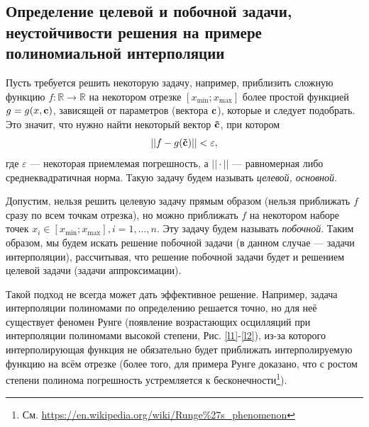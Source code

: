 \documentclass[a4paper]{article}
\begin{document}
\FloatBarrier 
\subsection{Определение целевой и побочной задачи, неустойчивости решения на примере полиномиальной интерполяции}
Пусть требуется решить некоторую задачу, например, приблизить сложную функцию $f: \mathbb{R} \rightarrow \mathbb{R}$
на некотором отрезке $[x_{\min};x_{\max}]$ более простой функцией $g=g(x,{\bf c})$, зависящей от параметров (вектора ${\bf c}$), которые и следует подобрать.
Это значит, что нужно найти некоторый вектор ${\bf \tilde{c} }$, при котором
\begin{equation*}
  ||f-g({\bf \tilde{c}})|| < \varepsilon,
\end{equation*}
где $\varepsilon$ --- некоторая приемлемая погрешность, а $||\cdot||$ --- равномерная либо среднеквадратичная норма.
Такую задачу будем называть {\it целевой, основной}.

Допустим, нельзя решить целевую задачу прямым образом (нельзя приближать $f$ сразу по всем точкам отрезка), но можно приближать $f$ на некотором наборе точек $x_i \in [x_{\min};x_{\max}], i=1,\dots,n$.
Эту задачу будем называть {\it побочной}. Таким образом,
мы будем искать решение побочной задачи (в данном случае --- задачи интерполяции),
рассчитывая, что решение побочной задачи будет и решением целевой задачи (задачи аппроксимации).

Такой подход не всегда может дать эффективное решение. Например, задача интерполяции полиномами по определению решается точно,
но для неё существует феномен Рунге (появление возрастающих осцилляций при интерполяции полиномами высокой степени, Рис. \ref{l1}-\ref{l2}),
из-за которого интерполирующая функция не обязательно будет приближать интерполируемую функцию на всём отрезке
(более того, для примера Рунге доказано, что с ростом степени полинома погрешность устремляется к бесконечности\footnote{См. \url{https://en.wikipedia.org/wiki/Runge\%27s_phenomenon} }).
\end{document}
